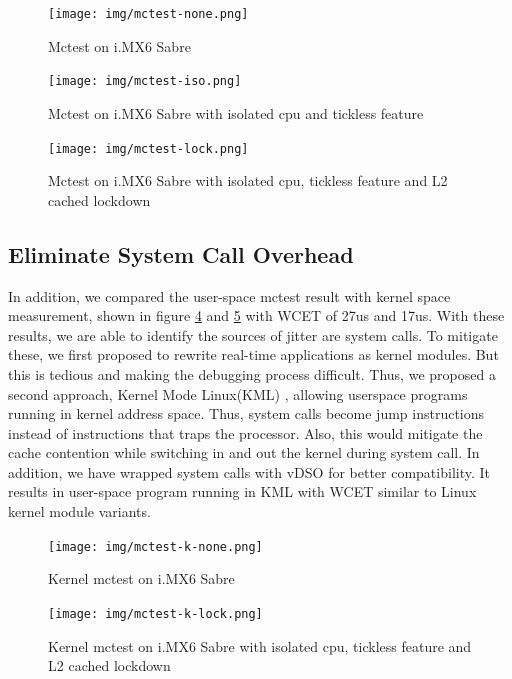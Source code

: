 \documentclass[conference]{IEEEtran}
\begin{document}
    \begin{figure} \centering \texttt{[image: img/mctest-none.png]} \caption{Mctest on i.MX6 Sabre}
    \label{fig:imx6_mctest_v} \end{figure}
    
    \begin{figure} \centering \texttt{[image: img/mctest-iso.png]} \caption{Mctest on i.MX6 Sabre with
    isolated cpu and tickless feature} \label{fig:imx6_mctest_iso} \end{figure}
    
    \begin{figure} \centering \texttt{[image: img/mctest-lock.png]} \caption{Mctest on i.MX6 Sabre with
    isolated cpu, tickless feature and L2 cached lockdown} \label{fig:imx6_mctest_lock} \end{figure}
    
    \subsection{Eliminate System Call Overhead}

    In addition, we compared the user-space mctest result with kernel space measurement, shown in figure
    \ref{fig:imx6_mctest_k_v} and \ref{fig:imx6_mctest_k_lock} with WCET of 27us and 17us. With these results, we are
    able to identify the sources of jitter are system calls. To mitigate these, we first proposed to rewrite real-time
    applications as kernel modules. But this is tedious and making the debugging process difficult. Thus, we proposed a
    second approach, Kernel Mode Linux(KML) \cite{KML} \cite{KMLConf}, allowing userspace programs running in kernel
    address space. Thus, system calls become jump instructions instead of instructions that traps the processor. Also,
    this would mitigate the cache contention while switching in and out the kernel during system call.
    In addition, we have wrapped system calls with vDSO \cite{vDSO} for better compatibility. It results in
    user-space program running in KML with WCET similar to Linux kernel module variants.

    \begin{figure} \centering \texttt{[image: img/mctest-k-none.png]} \caption{Kernel mctest on i.MX6 Sabre}
    \label{fig:imx6_mctest_k_v} \end{figure}
    
    \begin{figure} \centering \texttt{[image: img/mctest-k-lock.png]} \caption{Kernel mctest on i.MX6 Sabre
    with isolated cpu, tickless feature and L2 cached lockdown} \label{fig:imx6_mctest_k_lock} \end{figure}
    
\end{document}
